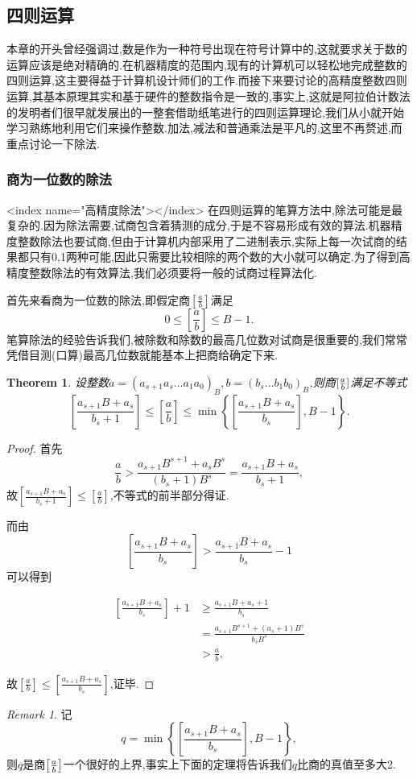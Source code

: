 \documentclass{ctexart}
\newtheorem{theorem}{Theorem}
\theoremstyle{remark}
\newtheorem{remark}{Remark}
\theoremstyle{definition}
\newtheorem{proof}{Proof}
\begin{document}
\subsection{四则运算}

本章的开头曾经强调过,数是作为一种符号出现在符号计算中的,这就要求关于数的运算应该是绝对精确的.在机器精度的范围内,现有的计算机可以轻松地完成整数的四则运算,这主要得益于计算机设计师们的工作.而接下来要讨论的高精度整数四则运算,其基本原理其实和基于硬件的整数指令是一致的,事实上,这就是阿拉伯计数法的发明者们很早就发展出的一整套借助纸笔进行的四则运算理论,我们从小就开始学习熟练地利用它们来操作整数.加法,减法和普通乘法是平凡的,这里不再赘述,而重点讨论一下除法.

\subsubsection{商为一位数的除法}
<index name="高精度除法"></index>
在四则运算的笔算方法中,除法可能是最复杂的.因为除法需要,试商包含着猜测的成分,于是不容易形成有效的算法.机器精度整数除法也要试商,但由于计算机内部采用了二进制表示,实际上每一次试商的结果都只有0,1两种可能,因此只需要比较相除的两个数的大小就可以确定.为了得到高精度整数除法的有效算法,我们必须要将一般的试商过程算法化.

首先来看商为一位数的除法,即假定商$\left[\frac{a}{b}\right]$满足$$0\le\left[\frac{a}{b}\right]\le B-1.$$笔算除法的经验告诉我们,被除数和除数的最高几位数对试商是很重要的,我们常常凭借目测(口算)最高几位数就能基本上把商给确定下来.

\begin{theorem}\label{th:division1}
设整数$a=(a_{s+1}a_s\ldots a_1a_0)_B,b=(b_s\ldots b_1b_0)_B$,则商$[{a\over b}]$满足不等式
$$\left[\frac{a_{s+1}B+a_s}{b_s+1}\right]\le\left[\frac{a}{b}\right]\le\min\left\{\left[\frac{a_{s+1}B+a_s}{b_s}\right],B-1\right\}.$$
\end{theorem}
\begin{proof}
首先$$\frac{a}{b}>\frac{a_{s+1}B^{s+1}+a_sB^s}{(b_s+1)B^s}=\frac{a_{s+1}B+a_s}{b_s+1},$$故$\left[\frac{a_{s+1}B+a_s}{b_s+1}\right] \le \left[\frac{a}{b}\right]$,不等式的前半部分得证.

而由$$\left[\frac{a_{s+1}B+a_s}{b_s}\right] > \frac{a_{s+1}B+a_s}{b_s}-1$$可以得到

\begin{align*}
  \left[\frac{a_{s+1}B+a_s}{b_s}\right]+1&\ge\frac{a_{s+1}B+a_s+1}{b_s}\\
&=\frac{a_{s+1}B^{s+1}+(a_s+1)B^s}{b_sB^s}\\
&>\frac{a}{b},
\end{align*}

故$\left[\frac{a}{b}\right]\le\left[\frac{a_{s+1}B+a_s}{b_s}\right]$,证毕.
\end{proof}
\begin{remark}
记$$q = \min\left\{\left[\frac{a_{s+1}B+a_s}{b_s}\right],B-1\right\},$$则$q$是商$\left[{a\over b}\right]$一个很好的上界,事实上下面的定理将告诉我们$q$比商的真值至多大2.
\end{remark}
\end{document}
